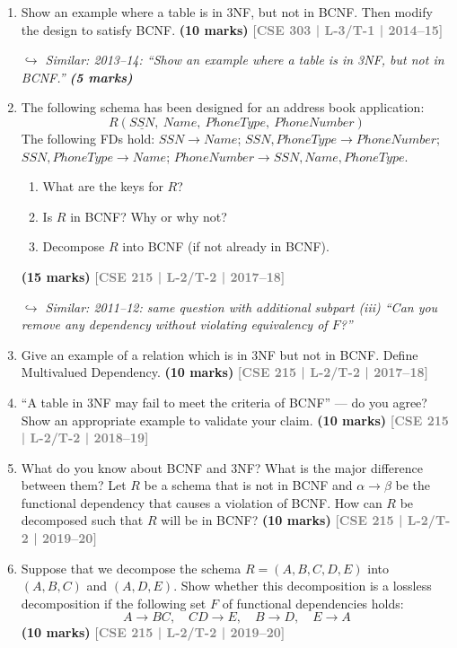 \documentclass[12pt,a3paper]{article}
\newcommand{\yr}[1]{\hfill\textcolor{gray}{\small\textbf{[#1]}}}
\newcommand{\mk}[1]{\textcolor{orange!70!black}{\small\textbf{(#1 marks)}}}
\newcommand{\variant}[1]{\par\vspace{1pt}\textcolor{blue!50!black}%
  {\footnotesize\textit{$\hookrightarrow$ Similar: #1}}}
\begin{document}
\begin{enumerate}
\item Show an example where a table is in 3NF, but not in BCNF. Then modify the design to satisfy BCNF.
\mk{10} \yr{CSE 303 | L-3/T-1 | 2014--15}

\variant{2013--14: ``Show an example where a table is in 3NF, but not in BCNF.'' \mk{5}}

\item The following schema has been designed for an address book application:
\[R(\underline{SSN},\ Name,\ PhoneType,\ PhoneNumber)\]
The following FDs hold: $SSN \to Name$;\; $SSN, PhoneType \to PhoneNumber$;\; $SSN, PhoneType \to Name$;\; $PhoneNumber \to SSN, Name, PhoneType$.
\begin{enumerate}
  \item What are the keys for $R$?
  \item Is $R$ in BCNF? Why or why not?
  \item Decompose $R$ into BCNF (if not already in BCNF).
\end{enumerate}
\mk{15} \yr{CSE 215 | L-2/T-2 | 2017--18}

\variant{2011--12: same question with additional subpart (iii) ``Can you remove any dependency without violating equivalency of $F$?''}

\item Give an example of a relation which is in 3NF but not in BCNF. Define Multivalued Dependency.
\mk{10} \yr{CSE 215 | L-2/T-2 | 2017--18}

\item ``A table in 3NF may fail to meet the criteria of BCNF'' --- do you agree? Show an appropriate example to validate your claim.
\mk{10} \yr{CSE 215 | L-2/T-2 | 2018--19}

\item What do you know about BCNF and 3NF? What is the major difference between them? Let $R$ be a schema that is not in BCNF and $\alpha \to \beta$ be the functional dependency that causes a violation of BCNF. How can $R$ be decomposed such that $R$ will be in BCNF?
\mk{10} \yr{CSE 215 | L-2/T-2 | 2019--20}

\item Suppose that we decompose the schema $R = (A, B, C, D, E)$ into $(A, B, C)$ and $(A, D, E)$. Show whether this decomposition is a lossless decomposition if the following set $F$ of functional dependencies holds:
\[A \to BC,\quad CD \to E,\quad B \to D,\quad E \to A\]
\mk{10} \yr{CSE 215 | L-2/T-2 | 2019--20}


\end{enumerate}
\end{document}
